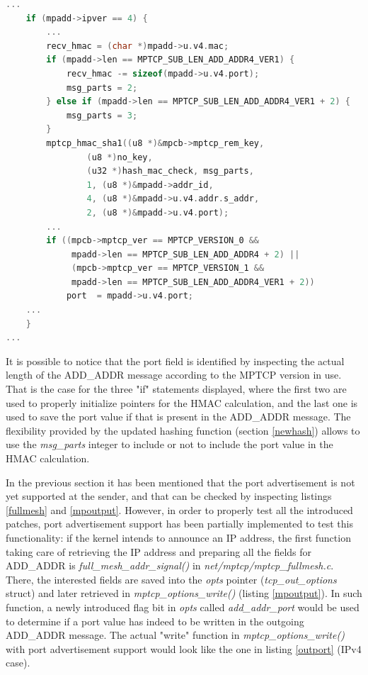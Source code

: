 \begin{lstlisting}[language=c, caption=\textit{Handling port field in ADD\_ADDR2 at the receiver}, label=portreceiver]
    ...
	if (mpadd->ipver == 4) {
        ...
		recv_hmac = (char *)mpadd->u.v4.mac;
		if (mpadd->len == MPTCP_SUB_LEN_ADD_ADDR4_VER1) {
			recv_hmac -= sizeof(mpadd->u.v4.port);
			msg_parts = 2;
		} else if (mpadd->len == MPTCP_SUB_LEN_ADD_ADDR4_VER1 + 2) {
			msg_parts = 3;
		}
		mptcp_hmac_sha1((u8 *)&mpcb->mptcp_rem_key,
				(u8 *)no_key,
				(u32 *)hash_mac_check, msg_parts,
				1, (u8 *)&mpadd->addr_id,
				4, (u8 *)&mpadd->u.v4.addr.s_addr,
				2, (u8 *)&mpadd->u.v4.port);
		...
		if ((mpcb->mptcp_ver == MPTCP_VERSION_0 &&
		     mpadd->len == MPTCP_SUB_LEN_ADD_ADDR4 + 2) ||
		     (mpcb->mptcp_ver == MPTCP_VERSION_1 &&
		     mpadd->len == MPTCP_SUB_LEN_ADD_ADDR4_VER1 + 2))
			port  = mpadd->u.v4.port;
	...	
	}
...
\end{lstlisting}

It is possible to notice that the port field is identified by inspecting the actual length of the ADD\_ADDR message according to the MPTCP version in use. That is the case for the three "if" statements displayed, where the first two are used to properly initialize pointers for the HMAC calculation, and the last one is used to save the port value if that is present in the ADD\_ADDR message. The flexibility provided by the updated hashing function (section \ref{newhash}) allows to use the \textit{msg\_parts} integer to include or not to include the port value in the HMAC calculation. 


In the previous section it has been mentioned that the port advertisement is not yet supported at the sender, and that can be checked by inspecting listings \ref{fullmesh} and \ref{mpoutput}. 
However, in order to properly test all the introduced patches, port advertisement support has been partially implemented to test this functionality: if the kernel intends to announce an IP address, the first function taking care of retrieving the IP address and preparing all the fields for ADD\_ADDR is \textit{full\_mesh\_addr\_signal()} in \textit{net/mptcp/mptcp\_fullmesh.c}. There, the interested fields are saved into the \textit{opts} pointer (\textit{tcp\_out\_options} struct) and later retrieved in \textit{mptcp\_options\_write()} (listing \ref{mpoutput}). In such function, a newly introduced flag bit in \textit{opts} called \textit{add\_addr\_port} would be used to determine if a port value has indeed to be written in the outgoing ADD\_ADDR message. The actual "write" function in \textit{mptcp\_options\_write()} with port advertisement support would look like the one in listing \ref{outport} (IPv4 case).

